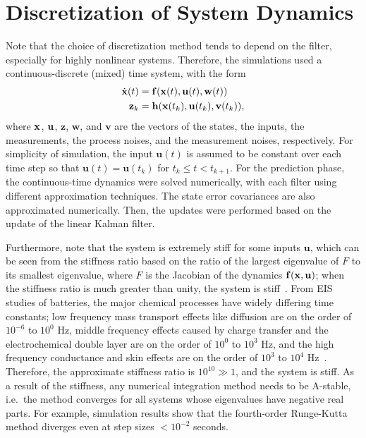 \documentclass[../zhang_thesis.tex]{subfiles}
\begin{document}
\section{Discretization of System Dynamics}
\label{sec:discret}

Note that the choice of discretization method tends to depend on the filter, especially for highly nonlinear systems. Therefore, the simulations used a continuous-discrete (mixed) time system, with the form
\begin{align}
    \dot{\mathbf{x}}(t) &= \mathbf{f}(\mathbf{x}(t),\mathbf{u}(t),\mathbf{w}(t)) \label{eq:gen_ct_f} \\
    \mathbf{z}_k &= \mathbf{h}(\mathbf{x}(t_k),\mathbf{u}(t_k),\mathbf{v}(t_k)),
\end{align}
where $\mathbf{x}$, $\mathbf{u}$, $\mathbf{z}$, $\mathbf{w}$, and $\mathbf{v}$ are the vectors of the states, the inputs, the measurements, the process noises, and the measurement noises, respectively. For simplicity of simulation, the input $\mathbf{u}(t)$ is assumed to be constant over each time step so that $\mathbf{u}(t)=\mathbf{u}(t_k)$ for $t_k\le t < t_{k+1}$. For the prediction phase, the continuous-time dynamics were solved numerically, with each filter using different approximation
techniques. The state error covariances are also approximated numerically. Then, the updates were performed based on the update of the linear Kalman filter.

Furthermore, note that the system is extremely stiff for some inputs $\mathbf{u}$, which can be seen from the stiffness ratio based on the ratio of the largest eigenvalue of $F$ to its smallest eigenvalue, where $F$ is the Jacobian of the dynamics $\mathbf{f}(\mathbf{x},\mathbf{u})$; when the stiffness ratio is much greater than unity, the system is stiff~\cite{lambert91,brugnano11}. From EIS studies of batteries, the major chemical processes have widely differing time constants; low frequency
mass transport effects like diffusion are on the order of $10^{-6}$ to $10^0$ Hz, middle frequency effects caused by charge transfer and the electrochemical double layer are on the order of $10^0$ to $10^3$ Hz, and the high frequency conductance and skin effects are on the order of $10^3$ to $10^4$ Hz~\cite{jossen06}. Therefore, the approximate stiffness ratio is $10^{10} \gg 1$, and the system is stiff. As a result of the stiffness, any numerical integration method needs to be A-stable,
i.e.\ the method converges for all systems whose eigenvalues have negative real parts. For example, simulation results show that the fourth-order Runge-Kutta method diverges even at step sizes $<10^{-2}$ seconds.
\end{document}
